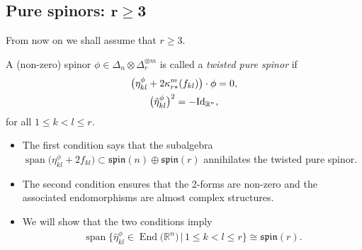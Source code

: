 \documentclass[pdftex]{sigma}
\numberwithin{equation}{section}
\begin{document}
\subsection[Pure spinors: $r\geq 3$]{Pure spinors: $\boldsymbol{r\geq 3}$}

From now on we shall assume that $r\geq 3$.

\begin{Definition} \label{def:pure-spinor}A (non-zero) spinor $\phi\in\Delta_n\otimes \Delta_r^{\otimes m}$ is called a {\em twisted pure spinor} if
\begin{gather}
\big(\eta_{kl}^\phi + 2 \kappa_{r*}^m(f_{kl})\big)\cdot \phi = 0,\label{eq: pure spinor condition 1}\\
\big(\hat\eta_{kl}^{\phi}\big)^2 = - {\rm Id}_{\mathbb{R}^n},\label{eq: pure spinor condition 2}
\end{gather}
for all $1\leq k<l\leq r$.
\end{Definition}

\begin{Remark}\quad
\begin{itemize}\itemsep=0pt
 \item The first condition says that the subalgebra $\operatorname{span}\big(\eta_{kl}^\phi+2f_{kl}\big) \subset\mathfrak{spin}(n)\oplus\mathfrak{spin}(r)$ annihilates the twisted pure spinor.
 \item The second condition ensures that the 2-forms are non-zero and the associated endomorphisms are almost complex structures.
 \item We will show that the two conditions imply
 \begin{gather*}\operatorname{span}\big\{\hat\eta_{kl}^\phi\in \operatorname{End}\big(\mathbb{R}^n\big)\,|\,1\leq k<l\leq r\big\}\cong\mathfrak{spin}(r).\end{gather*}
\end{itemize}
\end{Remark}
\end{document}
